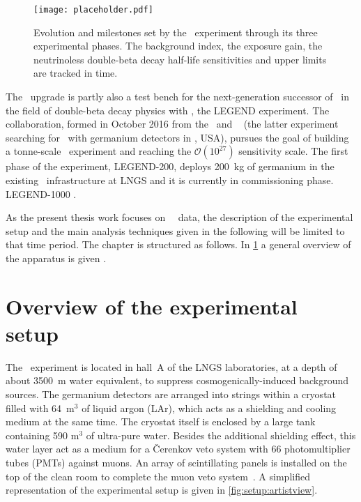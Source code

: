 \begin{figure}
  \centering
  \texttt{[image: placeholder.pdf]}
  \caption{%
    Evolution and milestones set by the \gerda\ experiment through its three experimental
    phases. The background index, the exposure gain, the neutrinoless double-beta decay
    half-life sensitivities and upper limits are tracked in time.
  }
\end{figure}

The \phasetwop\ upgrade is partly also a test bench for the next-generation successor of
\gerda\ in the field of double-beta decay physics with \gesix, the LEGEND experiment. The
collaboration, formed in October 2016 from the \gerda\ and \majorana~\cite{Abgrall2014}
(the latter experiment searching for \onbb\ with germanium detectors in \fillme, USA),
pursues the goal of building a tonne-scale \gesix\ experiment and reaching the
$\mathcal{O}(10^{27})$ sensitivity scale. The first phase of the experiment, LEGEND-200,
deploys 200~kg of germanium in the existing \gerda\ infrastructure at LNGS and it is
currently in commissioning phase. LEGEND-1000 \fillme.

As the present thesis work focuses on \gerda\ \phasetwo\ data, the description of the
experimental setup and the main analysis techniques given in the following will be limited
to that time period. The chapter is structured as follows. In
\cref{sec:gerda:setup} a general overview of the apparatus is given \fillme.

\section{Overview of the experimental setup}\label{sec:gerda:setup}

The \gerda\ experiment is located in hall~A of the LNGS laboratories, at a depth of about
3500~m water equivalent, to suppress cosmogenically-induced background sources. The
germanium detectors are arranged into strings within a cryostat filled with 64~m$^3$ of
liquid argon (LAr), which acts as a shielding and cooling medium at the same time. The
cryostat itself is enclosed by a large tank containing 590 m$^3$ of ultra-pure water.
Besides the additional shielding effect, this water layer act as a medium for a
\v{C}erenkov veto system with 66 photomultiplier tubes (PMTs) against muons. An array of
scintillating panels is installed on the top of the clean room to complete the muon veto
system~\cite{Freund2016}. A simplified representation of the experimental setup is given
in \cref{fig:setup:artistview}.

